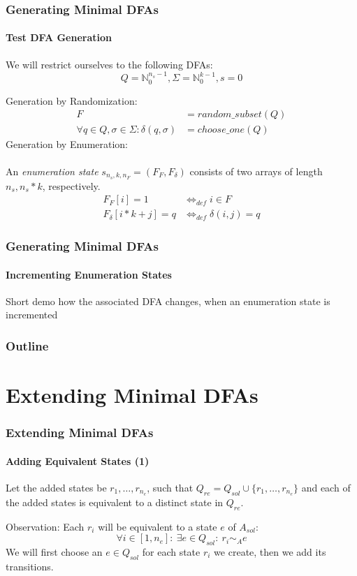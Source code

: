 \documentclass[handout,10pt]{beamer}%
\newcommand{\nSO}{{n_s}}
\newcommand{\nEQ}{{n_e}}
\newcommand{\nF}{{n_F}}
\newcommand{\kAL}{k}
\begin{document}
	\begin{frame}
		\frametitle{Generating Minimal DFAs}
		\framesubtitle{Test DFA Generation}
		We will restrict ourselves to the following DFAs:
		\[
			Q = \mathbb{N}_0^ {\nSO-1}, \Sigma = \mathbb{N}_0^{\kAL-1}, s = 0
		\]
		
		Generation by Randomization:
		\begin{align*}
		F &= random\_subset(Q)\\
			\forall q\in Q, \sigma\in\Sigma\colon \delta(q, \sigma) &= choose\_one(Q)
		\end{align*}
		Generation by Enumeration:\\$ $\\
		An \emph{enumeration state} $s_{\nSO, \kAL, \nF} = (F_F,F_\delta)$ consists of two arrays of length $\nSO, \nSO*\kAL$, respectively.
		\begin{align*}
			F_F[i] = 1 &\Leftrightarrow_{def} i \in F\\
			F_\delta[i * \kAL + j] = q &\Leftrightarrow_{def} \delta(i, j) = q
		\end{align*}
	
	\end{frame}

	\begin{frame}
		\frametitle{Generating Minimal DFAs}
		\framesubtitle{Incrementing Enumeration States}
		Short demo how the associated DFA changes, when an enumeration state is incremented
	
	\end{frame}
	
	
	\begin{frame}
		\frametitle{Outline}
		\tableofcontents %
	\end{frame}
	
	\section{Extending Minimal DFAs}

	\begin{frame}
		\frametitle{Extending Minimal DFAs}
		\framesubtitle{Adding Equivalent States (1)}
		Let the added states be $r_1,\ldots,r_\nEQ$, such that $Q_{re} = Q_{sol} \cup \{r_1,\ldots,r_\nEQ\}$ and each of the added states is equivalent to a distinct state in $Q_{re}$.
		
		\vspace{0.2cm}
		Observation: Each $r_i$ will be equivalent to a state $e$ of $A_{sol}$:
		\[
		\forall i \in [1,\nEQ] \colon\ \exists e \in Q_{sol}\colon\ r_i \sim_A e
		\]
		We will first choose an $e\in Q_{sol}$ for each state $r_i$ we create, then we add its transitions.
	
	\end{frame}
\end{document}
